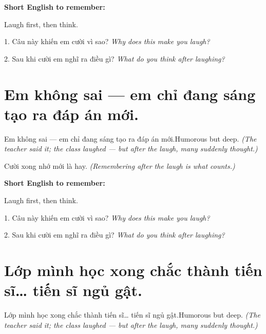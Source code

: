 \begin{ghinhoanh}
\textbf{Short English to remember:}

Laugh first, then think.

\end{ghinhoanh}

\begin{tuhocnhanh}
1. Câu này khiến em cười vì sao? \textit{Why does this make you laugh?}

2. Sau khi cười em nghĩ ra điều gì? \textit{What do you think after laughing?}
\end{tuhocnhanh}
\ngancach


\section{Em không sai — em chỉ đang sáng tạo ra đáp án mới.}
\begin{truyen}{Em không sai — em chỉ đang sáng tạo ra đáp án mới.}{Humorous but deep.}
\textit{(The teacher said it; the class laughed — but after the laugh, many suddenly thought.)}
\end{truyen}

\begin{baihoc}
Cười xong nhớ mới là hay.
\textit{(Remembering after the laugh is what counts.)}
\end{baihoc}

\begin{ghinhoanh}
\textbf{Short English to remember:}

Laugh first, then think.

\end{ghinhoanh}

\begin{tuhocnhanh}
1. Câu này khiến em cười vì sao? \textit{Why does this make you laugh?}

2. Sau khi cười em nghĩ ra điều gì? \textit{What do you think after laughing?}
\end{tuhocnhanh}
\ngancach


\section{Lớp mình học xong chắc thành tiến sĩ… tiến sĩ ngủ gật.}
\begin{truyen}{Lớp mình học xong chắc thành tiến sĩ… tiến sĩ ngủ gật.}{Humorous but deep.}
\textit{(The teacher said it; the class laughed — but after the laugh, many suddenly thought.)}
\end{truyen}

